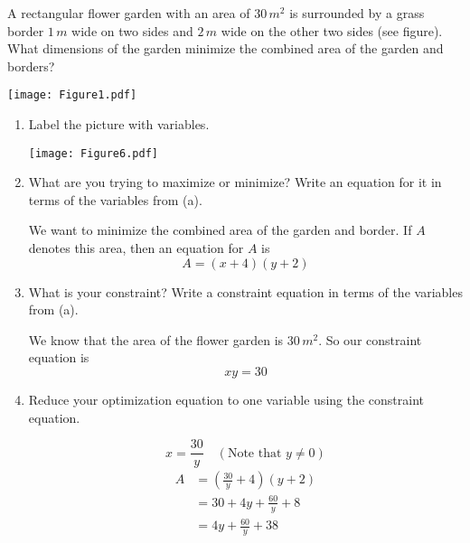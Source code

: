 \documentclass[nooutcomes]{ximera}
\begin{document}
\begin{problem}
A rectangular flower garden with an area of $30 \, m^2$ is surrounded by a grass border $1 \, m$ wide on two sides and $2 \, m$ wide on the other two sides (see figure).  What dimensions of the garden minimize the combined area of the garden and borders?

	\begin{image}
	\texttt{[image: Figure1.pdf]}
	\end{image}

	\begin{enumerate}
	
	\item  Label the picture with variables.
		\begin{freeResponse}
		\begin{image}
		\texttt{[image: Figure6.pdf]}
		\end{image}
		\end{freeResponse}
		
		
		
	\item  What are you trying to maximize or minimize?  Write an equation for it in terms of the variables from (a).
		\begin{freeResponse}
		We want to minimize the combined area of the garden and border.  If $A$ denotes this area, then an equation for $A$ is
		$$ A = (x+4)(y+2) $$
		\end{freeResponse}
		
		
		
	\item  What is your constraint?  Write a constraint equation in terms of the variables from (a).
		\begin{freeResponse}
		We know that the area of the flower garden is $30 \, m^2$.  So our constraint equation is
		$$ xy = 30 $$
		\end{freeResponse}
		
		
		
	\item  Reduce your optimization equation to one variable using the constraint equation.
		\begin{freeResponse}
		$$ x = \frac{30}{y} \quad (\text{Note that } y \neq 0) $$
		\begin{align}
		A &= \left( \frac{30}{y} + 4 \right)(y+2) \\
		&= 30 + 4y + \frac{60}{y} + 8 \\
		&=4y + \frac{60}{y} + 38 \label{eqn3}
		\end{align}
		\end{freeResponse}
		

\end{enumerate}
\end{problem}
\end{document}

